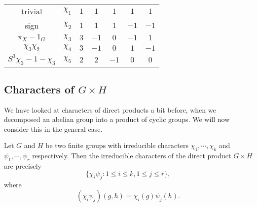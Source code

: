 \documentclass[a4paper]{article}
\begin{document}
\begin{eg}
\begin{center}
\begin{tabular}{ccccccc}
      \midrule
      trivial & $\chi_1$ & $1$ & $1$ & $1$ & $1$ & $1$\\
      sign & $\chi_2$ & $1$ & $1$ & $1$ & $-1$ & $-1$\\
      $\pi_X - 1_G$ & $\chi_3$ & $3$ & $-1$ & $0$ & $-1$ & $1$\\
      $\chi_3 \chi_2$ & $\chi_4$ & $3$ & $-1$ & $0$ & $1$ & $-1$\\
      $S^3 \chi_3 - 1 - \chi_3$ & $\chi_5$ & $2$ & $2$ & $-1$ & $0$ & $0$\\
      \bottomrule
    \end{tabular}
  \end{center}
\end{eg}

\subsection{Characters of \texorpdfstring{$G\times H$}{G x H}}
We have looked at characters of direct products a bit before, when we decomposed an abelian group into a product of cyclic groups. We will now consider this in the general case.

\begin{prop}
  Let $G$ and $H$ be two finite groups with irreducible characters $\chi_1, \cdots, \chi_k$ and $\psi_1, \cdots, \psi_r$ respectively. Then the irreducible characters of the direct product $G\times H$ are precisely
  \[
    \{\chi_i \psi_j: 1 \leq i \leq k, 1 \leq j \leq r\},
  \]
  where
  \[
    (\chi_i \psi_j)(g, h) = \chi_i(g) \psi_j(h).
  \]
\end{prop}
\end{document}
